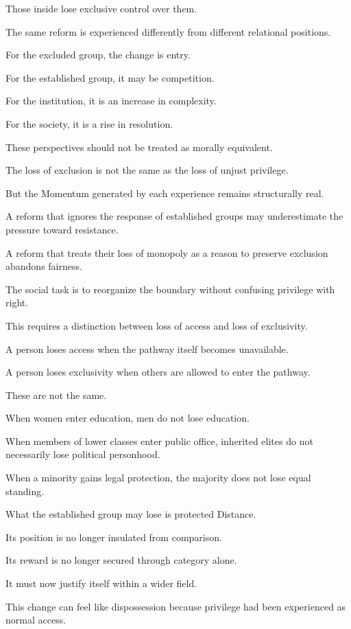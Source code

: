 Those inside lose exclusive control over them.

The same reform is experienced differently from different relational positions.

For the excluded group, the change is entry.

For the established group, it may be competition.

For the institution, it is an increase in complexity.

For the society, it is a rise in resolution.

These perspectives should not be treated as morally equivalent.

The loss of exclusion is not the same as the loss of unjust privilege.

But the Momentum generated by each experience remains structurally real.

A reform that ignores the response of established groups may underestimate the pressure toward resistance.

A reform that treats their loss of monopoly as a reason to preserve exclusion abandons fairness.

The social task is to reorganize the boundary without confusing privilege with right.

This requires a distinction between loss of access and loss of exclusivity.

A person loses access when the pathway itself becomes unavailable.

A person loses exclusivity when others are allowed to enter the pathway.

These are not the same.

When women enter education, men do not lose education.

When members of lower classes enter public office, inherited elites do not necessarily lose political personhood.

When a minority gains legal protection, the majority does not lose equal standing.

What the established group may lose is protected Distance.

Its position is no longer insulated from comparison.

Its reward is no longer secured through category alone.

It must now justify itself within a wider field.

This change can feel like dispossession because privilege had been experienced as normal access.

